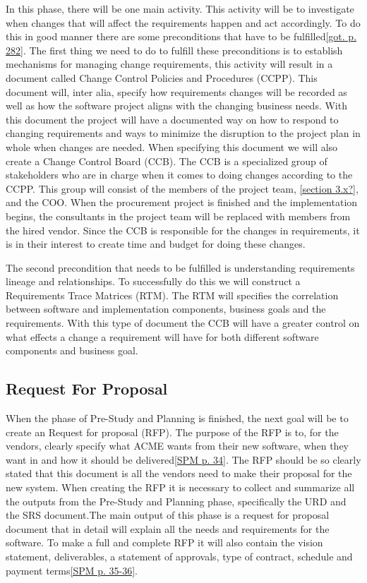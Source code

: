 \documentclass[a4paper]{article}
\begin{document}
In this phase, there will be one main activity. This activity will be to investigate when changes that will affect the requirements happen and act accordingly. To do this in good manner there are some preconditions that have to be fulfilled\ref{got. p. 282}. The first thing we need to do to fulfill these preconditions is to establish mechanisms for managing change requirements, this activity will result in a document called Change Control Policies and Procedures (CCPP). This document will, inter alia, specify how requirements changes will be recorded as well as how the software project aligns with the changing business needs. With this document the project will have a documented way on how to respond to changing requirements and ways to minimize the disruption to the project plan in whole when changes are needed. When specifying this document we will also create a Change Control Board (CCB). The CCB is a specialized group of stakeholders who are in charge when it comes to doing changes according to the CCPP. This group will consist of the members of the project team, \ref{section 3.x?}, and the COO. When the procurement project is finished and the implementation begins, the consultants in the project team will be replaced with members from the hired vendor. Since the CCB is responsible for the changes in requirements, it is in their interest to create time and budget for doing these changes.

The second precondition that needs to be fulfilled is understanding requirements lineage and relationships. To successfully do this we will construct a Requirements Trace Matrices (RTM). The RTM will specifies the correlation between software and implementation components, business goals and the requirements. With this type of document the CCB will have a greater control on what effects a change a requirement will have for both different software components and business goal. 

\subsection{Request For Proposal}
\label{sub:request_for_propsal}
When the phase of Pre-Study and Planning is finished, the next goal will be to create an Request for proposal (RFP). The purpose of the RFP is to, for the vendors, clearly specify what ACME wants from their new software, when they want in and how it should be delivered\ref{SPM p. 34}. The RFP should be so clearly stated that this document is all the vendors need to make their proposal for the new system. 
When creating the RFP it is necessary to collect and summarize all the outputs from the Pre-Study and Planning phase, specifically the URD and the SRS document.The main output of this phase is a request for proposal document that in detail will explain all the needs and requirements for the software. To make a full and complete RFP it will also contain the vision statement, deliverables, a statement of approvals, type of contract, schedule and payment terms\ref{SPM p. 35-36}.
\end{document}
